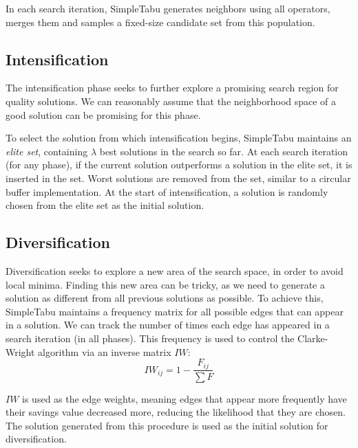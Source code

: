 \documentclass[12pt]{report}
\begin{document}
In each search iteration, SimpleTabu generates neighbors using all operators, merges them and samples a fixed-size candidate set from this population.

\subsection{Intensification}
The intensification phase seeks to further explore a promising search region for quality solutions. We can reasonably assume that the neighborhood space of a good solution can be promising for this phase.

To select the solution from which intensification begins, SimpleTabu maintains an \textit{elite set}, containing $\lambda$ best solutions in the search so far. At each search iteration (for any phase), if the current solution outperforms a solution in the elite set, it is inserted in the set. Worst solutions are removed from the set, similar to a circular buffer implementation. At the start of intensification, a solution is randomly chosen from the elite set as the initial solution.

\subsection{Diversification}
Diversification seeks to explore a new area of the search space, in order to avoid local minima. Finding this new area can be tricky, as we need to generate a solution as different from all previous solutions as possible. To achieve this, SimpleTabu maintains a frequency matrix for all possible edges that can appear in a solution. We can track the number of times each edge has appeared in a search iteration (in all phases). This frequency is used to control the Clarke-Wright algorithm via an inverse matrix $IW$:
\[
	IW_{ij} = 1 - \frac{F_{ij}}{\sum F}
\]

$IW$ is used as the edge weights, meaning edges that appear more frequently have their savings value decreased more, reducing the likelihood that they are chosen. The solution generated from this procedure is used as the initial solution for diversification.

\end{document}
